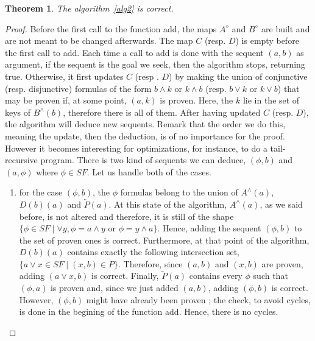 \documentclass[a4paper, 11pt]{article}
\newtheorem{theorem}{Theorem}
\begin{document}
    \begin{theorem}
	    The algorithm~\ref{alg2} is correct.
    \end{theorem}
    \begin{proof}
	    Before the first call to the function \textsf{add}, the maps $A^\diamond$ and $B^\diamond$
	    are built and are not meant to be changed afterwards. The map $C$ (resp. $D$) is empty 
	    before the
	    first call to \textsf{add}. Each time a call to \textsf{add} is done with the sequent 
	    $(a,b)$ as argument,
	    if the sequent is the goal we seek, then the algorithm stops, returning true. Otherwise,
	    it first updates $C$ (resp . $D$) by making the union of conjunctive (resp. disjunctive) 
	    formulas of the form $b\wedge k$ or $k\wedge b$ (resp. $b\vee k$ or $k\vee b$) that may be 
	    proven if, at some point, $(a,k)$ is proven. Here, the $k$ lie in
	    the set of keys of $B^\wedge(b)$, therefore there is all of them. After having updated $C$
	    (resp. $D$),
	    the algorithm will deduce new sequents. Remark that the order we do this, meaning the
	    update, then the deduction, is of no importance for the proof. However it becomes 
	    interesting for
	    optimizations, for instance, to do a tail-recursive program. There is two kind of sequents
	    we can deduce, $(\phi,b)$ and $(a,\phi)$ where $\phi\in SF$. Let us handle both of the cases.
	    \begin{enumerate}
		    \item
			    for the case $(\phi,b)$, the $\phi$ formulas belong to the union of 
			    $A^\wedge(a)$, $D(b)(a)$ and $\overleftarrow{P}(a)$. At this state of the 
			    algorithm, $A^\wedge(a)$,
			    as we said before, is not altered and therefore, it is still of the shape
			    $\{\phi\in SF\mid\forall y,\phi=a\wedge y\text{ or }\phi=y\wedge a\}$. Hence,
			    adding the sequent $(\phi,b)$ to the set of proven ones is correct.
			    Furthermore, at that point of the algorithm, $D(b)(a)$ contains exactly the 
			    following intersection set, $\{a\vee x\in SF\mid(x,b)\in P\}$. Therefore,
			    since $(a,b)$ and $(x,b)$ are proven, adding $(a\vee x,b)$ is correct.
			    Finally, $\overleftarrow{P}(a)$ contains every $\phi$ such that $(\phi,a)$
			    is proven and, since we just added $(a,b)$, adding $(\phi,b)$ is correct.
			    However, $(\phi,b)$ might have already been proven ; the check, to avoid
			    cycles, is done in the begining of the function \textsf{add}. Hence, there is
			    no cycles.

\end{enumerate}
\end{proof}
\end{document}
